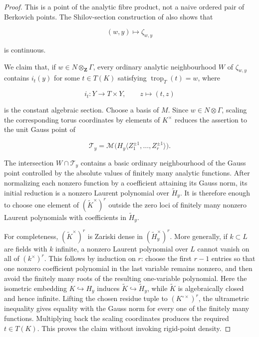 \begin{proof}
This is a point of the analytic fibre product, not a naive ordered pair of
Berkovich points.  The Shilov-section construction of
\cite[\S\S12.1.10--12.1.11]{CLD25} also shows that

\[
             (w,y)\longmapsto\zeta_{w,y}
\]

is continuous.

We claim that, if \(w\in N\otimes_{\mathbf Z}\Gamma\), every ordinary
analytic neighbourhood \(W\) of \(\zeta_{w,y}\) contains \(i_t(y)\) for
some \(t\in T(K)\) satisfying \(\operatorname{trop}_T(t)=w\), where

\[
                       i_t:Y\longrightarrow T\times Y,
                       \qquad z\longmapsto(t,z)
\]

is the constant algebraic section.  Choose a basis of \(M\).  Since
\(w\in N\otimes\Gamma\), scaling the corresponding torus coordinates by
elements of \(K^\times\) reduces the assertion to the unit Gauss point of

\[
 \mathcal T_y=\mathcal M\bigl(
 H_y\langle Z_1^{\pm1},\ldots,Z_r^{\pm1}\rangle\bigr).
\]

The intersection \(W\cap\mathcal T_y\) contains a basic ordinary
neighbourhood of the Gauss point controlled by the absolute values of
finitely many analytic functions.  After normalizing each nonzero function
by a coefficient attaining its Gauss norm, its initial reduction is a
nonzero Laurent polynomial over \(\widetilde H_y\).  It is therefore enough
to choose one element of \((\widetilde K^\times)^r\) outside the zero loci
of finitely many nonzero Laurent polynomials with coefficients in
\(\widetilde H_y\).

For completeness, \((\widetilde K^\times)^r\) is Zariski dense in
\((\widetilde H_y^\times)^r\).  More generally, if \(k\subset L\) are
fields with \(k\) infinite, a nonzero Laurent polynomial over \(L\) cannot
vanish on all of \((k^\times)^r\).  This follows by induction on \(r\):
choose the first \(r-1\) entries so that one nonzero coefficient polynomial
in the last variable remains nonzero, and then avoid the finitely many
roots of the resulting one-variable polynomial.  Here the isometric
embedding \(K\hookrightarrow H_y\) induces
\(\widetilde K\hookrightarrow\widetilde H_y\), while \(\widetilde K\) is
algebraically closed and hence infinite.  Lifting the chosen residue tuple
to \((K^{\circ\times})^r\), the ultrametric inequality gives equality with
the Gauss norm for every one of the finitely many functions.  Multiplying
back the scaling coordinates produces the required \(t\in T(K)\).  This
proves the claim without invoking rigid-point density.


\end{proof}
